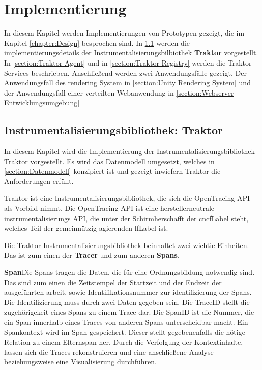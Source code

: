 %
\chapter{Implementierung}
\label{chapter:Implementierung}

In diesem Kapitel werden Implementierungen von Prototypen gezeigt, die im Kapitel \cref{chapter:Design} besprochen sind. In \cref{section:Instrumentalisierungsbibliothek: Traktor} werden die implementierungsdetails der Instrumentalisierungsbilbiothek \textbf{Traktor} vorgestellt. In \cref{section:Traktor Agent} und in \cref{section:Traktor Registry} werden die Traktor Services beschrieben. Anschließend werden zwei Anwendungsfälle gezeigt. Der Anwendungsfall des rendering System in \cref{section:Unity Rendering System} und der Anwendungsfall einer verteilten Webanwendung in \cref{section:Webserver Entwicklungsumgebung}

\section{Instrumentalisierungsbibliothek: Traktor}
\label{section:Instrumentalisierungsbibliothek: Traktor}
In diesem Kapitel wird die Implementierung der Instrumentalisierungsbibliothek Traktor vorgestellt. Es wird das Datenmodell umgesetzt, welches in \cref{section:Datenmodell} konzipiert ist und gezeigt inwiefern Traktor die Anforderungen erfüllt.

Traktor ist eine Instrumentalisierungsbibliothek, die sich die OpenTracing API als Vorbild nimmt. Die OpenTracing API ist eine herstellerneutrale instrumentalisierungs API, die unter der Schirmherschafft der \gls{cncfLabel} steht, welches Teil der gemeinnützig agierenden \gls{lfLabel} ist.

Die Traktor Instrumentalisierungsbibliothek beinhaltet zwei wichtie Einheiten. Das ist zum einen der \textbf{Tracer} und zum anderen \textbf{Spans}. 

\textbf{Span}\space\space\space Die Spans tragen die Daten, die für eine Ordnungsbildung notwendig sind. Das sind zum einen die Zeitstempel der Startzeit und der Endzeit der ausgeführten arbeit, sowie Identifikationsnummer zur identifizierung der Spans. Die Identifizierung muss durch zwei Daten gegeben sein. Die TraceID stellt die zugehörigekeit eines Spans zu einem Trace dar. Die SpanID ist die Nummer, die ein Span innerhalb eines Traces von anderen Spans unterscheidbar macht. Ein Spankontext wird im Span gespeichert. Dieser stellt gegebenenfalls die nötige Relation zu einem Elternspan her. Durch die Verfolgung der Kontextinhalte, lassen sich die Traces rekonstruieren und eine anschließene Analyse beziehungsweise eine Visualisierung durchführen.

